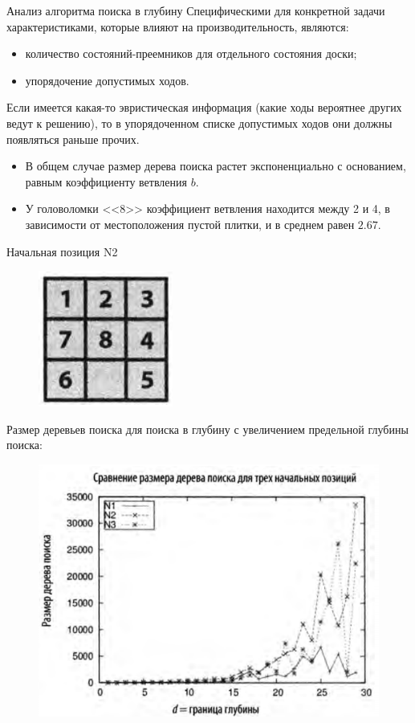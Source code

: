 \documentclass{beamer}
\begin{document}
\begin{frame}{Анализ алгоритма поиска в глубину}
Специфическими для конкретной задачи характеристиками, которые влияют
на производительность, являются:
\begin{itemize}
\item количество состояний-преемников для отдельного состояния доски;
\item упорядочение допустимых ходов.
\end{itemize}
Если имеется какая-то эвристическая информация (какие ходы вероятнее других ведут к решению), то в упорядоченном списке допустимых ходов они должны появляться раньше прочих.
\begin{itemize}
\item В общем случае размер дерева поиска растет экспоненциально с основанием, равным коэффициенту ветвления $b$. 
\item У головоломки <<8>> коэффициент ветвления находится между 2 и 4, в зависимости от местоположения пустой плитки, и в среднем равен $2.67$. 
\end{itemize}
\end{frame}

\begin{frame}
Начальная позиция N2
\begin{figure}[h]
\centering
\includegraphics[scale=0.25]{images/lec06-pic04.png}
\end{figure}
Размер деревьев поиска для поиска в глубину с увеличением предельной глубины поиска:
\begin{figure}[h]
\centering
\includegraphics[scale=0.45]{images/lec06-pic05.png}
\end{figure}
\end{frame}
\end{document}
